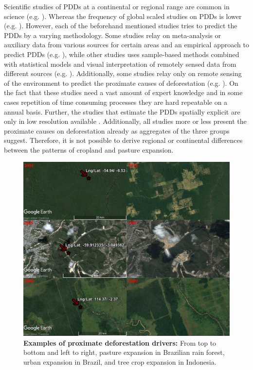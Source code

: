 	Scientific studies of \acp{PDD} at a continental or regional range are common in science (e.g. \citet{Sy2015,Austin2019,Zalles2018,Meyfroidt2013,Caldas2013,Graesser2015,Ruf2014,Connette2016,Barima2016,Furumo2017,Vijay2018}). Whereas the frequency of global scaled studies on \acp{PDD} is lower (e.g. \citet{Curtis2018,Hosonuma2012,Geist2002,DeFries2010,Carter2018}). However, each of the beforehand mentioned studies tries to predict the \acp{PDD} by a varying methodology. Some studies relay on meta-analysis or auxiliary data from various sources for certain areas and an empirical approach to predict \acp{PDD} (e.g. \citet{Hosonuma2012,Geist2002,DeFries2010,Carter2018,Ruf2014}), while other studies uses sample-based methods combined with statistical models and visual interpretation of remotely sensed data from different sources (e.g. \citet{Sy2015,Austin2019,Curtis2018,Meyfroidt2013,Caldas2013}). Additionally, some studies relay only on remote sensing of the environment to predict the proximate causes of deforestation (e.g. \citet{Caldas2013,Zalles2018,Graesser2015,Connette2016,Barima2016}). On the fact that these studies need a vast amount of expert knowledge and in some cases repetition of time consuming processes they are hard repeatable on a annual basis. Further, the studies that estimate the \acp{PDD} spatially explicit are only in low resolution available \citep{Curtis2018,Caldas2013}. Additionally, all studies more or less present the proximate causes on deforestation already as aggregates of the three groups \citeauthor{Geist2001} suggest. Therefore, it is not possible to derive regional or continental differences between the patterns of cropland and pasture expansion.
	\begin{figure}[ht]
		\centering
		\includegraphics[scale=0.6]{img/deforestation_examples}
		\caption[Examples of proximate deforestation drivers]{\textbf{Examples of proximate deforestation drivers:} From top to bottom and left to right, pasture expansion in Brazilian rain forest, urban expansion in Brazil, and tree crop expansion in Indonesia.}
		\label{fig:deforestationexamples}
	\end{figure}

